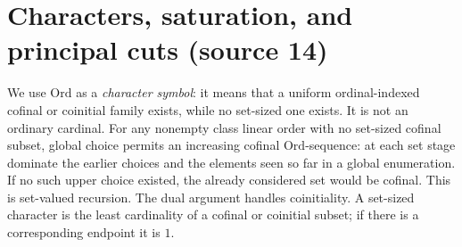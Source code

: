 \documentclass[11pt]{article}
\theoremstyle{definition}
\theoremstyle{remark}
\newcommand{\Ord}{\mathrm{Ord}}
\begin{document}
\section{Characters, saturation, and principal cuts (source 14)}
\label{swo:tc:sec:characters}
We use $\Ord$ as a \emph{character symbol}: it means that a uniform
ordinal-indexed cofinal or coinitial family exists, while no set-sized
one exists. It is not an ordinary cardinal. For any nonempty class
linear order with no set-sized cofinal subset, global choice permits
an increasing cofinal $\Ord$-sequence: at each set stage dominate the
earlier choices and the elements seen so far in a global enumeration.
If no such upper choice existed, the already considered set would be
cofinal. This is set-valued recursion. The dual argument handles
coinitiality. A set-sized character is the least cardinality of a
cofinal or coinitial subset; if there is a corresponding endpoint it
is $1$.
\end{document}

